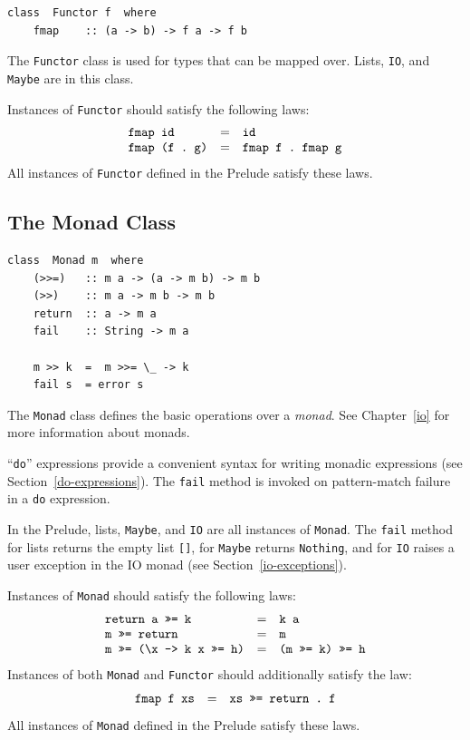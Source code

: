 \bprog
{\small\begin{verbatim}
class  Functor f  where
    fmap    :: (a -> b) -> f a -> f b
\end{verbatim}}
\eprog
The \mbox{\tt Functor}
class is used for types that can be mapped over.  Lists, \mbox{\tt IO}, and
\mbox{\tt Maybe} are in this class. 

Instances of \mbox{\tt Functor} should satisfy the following laws:
\[\ba{lcl}
\mbox{\tt fmap\ id}&=&\mbox{\tt id}\\
\mbox{\tt fmap\ (f\ .\ g)}&=&\mbox{\tt fmap\ f\ .\ fmap\ g}\\
\ea\]\ifhtml{\\}{}
All instances of \mbox{\tt Functor} defined in the Prelude satisfy these laws.


\subsection{The Monad Class}
\label{monad-class}
\indextt{>>}
\indextt{>>=}
\bprog
{\small\begin{verbatim}
class  Monad m  where
    (>>=)   :: m a -> (a -> m b) -> m b
    (>>)    :: m a -> m b -> m b
    return  :: a -> m a
    fail    :: String -> m a

    m >> k  =  m >>= \_ -> k
    fail s  = error s
\end{verbatim}}
\eprog
The \mbox{\tt Monad} class defines the basic operations over a {\em monad}.
See Chapter~\ref{io} for more information about monads.

``\mbox{\tt do}'' expressions provide a convenient syntax for writing
monadic expressions (see Section~\ref{do-expressions}).
The \mbox{\tt fail} method is invoked on pattern-match failure in a \mbox{\tt do}
expression.

In the Prelude, lists, 
\mbox{\tt Maybe}, and \mbox{\tt IO} are all instances of \mbox{\tt Monad}.
The \mbox{\tt fail} method for lists returns the empty list \mbox{\tt []},
for \mbox{\tt Maybe} returns \mbox{\tt Nothing}, and for \mbox{\tt IO} raises a user
exception in the IO monad (see Section~\ref{io-exceptions}).

Instances of \mbox{\tt Monad} should satisfy the following laws:
\[\ba{lcl}
\mbox{\tt return\ a\ >>=\ k}&=&\mbox{\tt k\ a} \\
\mbox{\tt m\ >>=\ return}&=&\mbox{\tt m} \\
\mbox{\tt m\ >>=\ ({\char'134}x\ ->\ k\ x\ >>=\ h)}&=&\mbox{\tt (m\ >>=\ k)\ >>=\ h}\\
\ea\]\ifhtml{\\}{}
Instances of both \mbox{\tt Monad} and \mbox{\tt Functor} should additionally satisfy the law:
\[\ba{lcl}
\mbox{\tt fmap\ f\ xs}&=&\mbox{\tt xs\ >>=\ return\ .\ f}\\
\ea\]\ifhtml{\\}{}
All instances of \mbox{\tt Monad} defined in the Prelude satisfy these laws.

